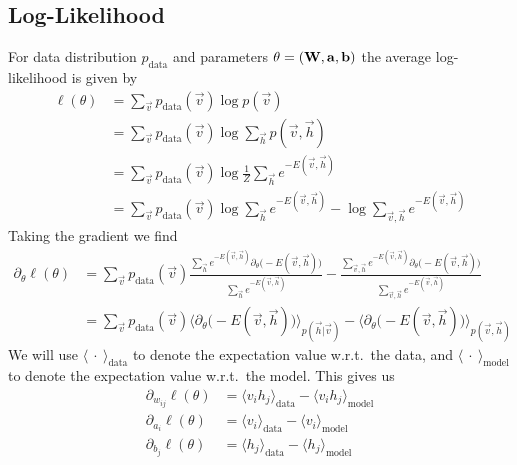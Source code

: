 \subsection{Log-Likelihood}\label{app:rbm_log_likelihood_derivation}
For data distribution \( p_\text{data} \) and parameters \( \theta = (\mathbf{W}, \mathbf{a}, \mathbf{b}) \) the average log-likelihood is given by
\begin{align}
    \ell(\theta)
        &= \sum_{\vec{v}} p_{\text{data}}(\vec{v}) \log p(\vec{v}) \\
        &= \sum_{\vec{v}} p_{\text{data}}(\vec{v}) \log \sum_\vec{h} p(\vec{v},\vec{h}) \\
        &= \sum_{\vec{v}} p_{\text{data}}(\vec{v}) \log \frac{1}{Z} \sum_\vec{h} e^{-E(\vec{v},\vec{h})}  \\
        &= \sum_{\vec{v}} p_{\text{data}}(\vec{v}) \log \sum_\vec{h} e^{-E(\vec{v},\vec{h})} - \log \sum_{\vec{v},\vec{h}} e^{-E(\vec{v},\vec{h})}
\end{align}
Taking the gradient we find
\begin{align}
    \partial_{\theta} \ell(\theta)
        &= \sum_{\vec{v}} p_{\text{data}}(\vec{v}) \frac{\sum_\vec{h} e^{-E(\vec{v},\vec{h})} \partial_{\theta}\big( -E(\vec{v},\vec{h}) \big) }{\sum_\vec{h} e^{-E(\vec{v},\vec{h})}}
            - \frac{\sum_{\vec{v},\vec{h}} e^{-E(\vec{v},\vec{h})} \partial_{\theta}\big( -E(\vec{v},\vec{h}) \big) }{\sum_{\vec{v},\vec{h}} e^{-E(\vec{v},\vec{h})}} \\
        &= \sum_{\vec{v}} p_{\text{data}}(\vec{v}) \Big\langle \partial_{\theta}\big( -E(\vec{v},\vec{h}) \big) \Big\rangle_{p(\vec{h}|\vec{v})}
        - \Big\langle \partial_{\theta}\big( -E(\vec{v},\vec{h}) \big) \Big\rangle_{p(\vec{v},\vec{h})}
\end{align}
We will use \( \langle \ \cdot \ \rangle_{\text{data}} \) to denote the expectation value w.r.t.\ the data, and \( \langle \ \cdot \ \rangle_{\text{model}} \) to denote the expectation value w.r.t.\ the model.
This gives us
\begin{align}
    \partial_{w_{ij}} \ell(\theta)
        &= \langle v_i h_j \rangle_{\text{data}} - \langle v_i h_j \rangle_{\text{model}} \\
    \partial_{a_i} \ell(\theta)
        &= \langle v_i \rangle_{\text{data}} - \langle v_i \rangle_{\text{model}} \\
    \partial_{b_j} \ell(\theta)
        &= \langle h_j \rangle_{\text{data}} - \langle h_j \rangle_{\text{model}}
\end{align}

